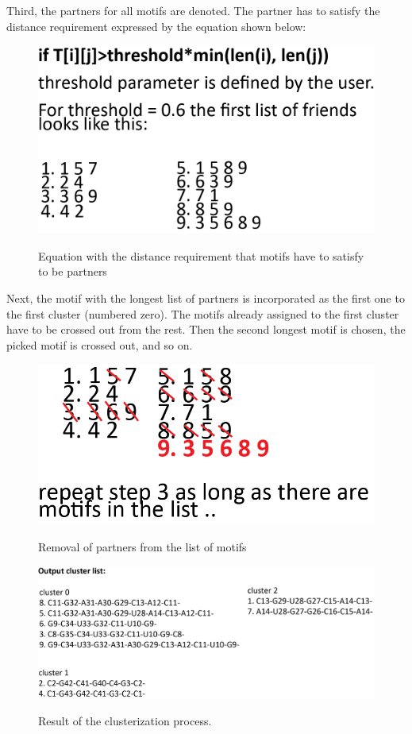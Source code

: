 \documentclass[12pt]{article}
\begin{document}
\newpage
Third, the partners for all motifs are denoted. The partner has to satisfy the distance requirement expressed by the equation shown below:
\begin{figure}[h!]
\centering
\includegraphics[scale=1]{./pictures/cluster_motif_step3.png}
\label{MotifsClusteringStep3}
\caption{Equation with the distance requirement that motifs have to satisfy to be partners}
\end{figure}

Next, the motif with the longest list of partners is incorporated as the first one to the first cluster (numbered zero). The motifs already assigned to the first cluster have to be crossed out from the rest. Then the second longest motif is chosen, the picked motif is crossed out, and so on.  

\begin{figure}[h!]
\centering
\includegraphics[scale=1]{./pictures/cluster_motif_step4.png}
\label{MotifsClusteringStep4}
\caption{Removal of partners from the list of motifs}
\end{figure}

\begin{figure}[h!]
\centering
\includegraphics[scale=1]{./pictures/cluster_motif_step5.png}
\label{MotifsClusteringStep5}
\caption{Result of the clusterization process.}
\end{figure}
\end{document}
